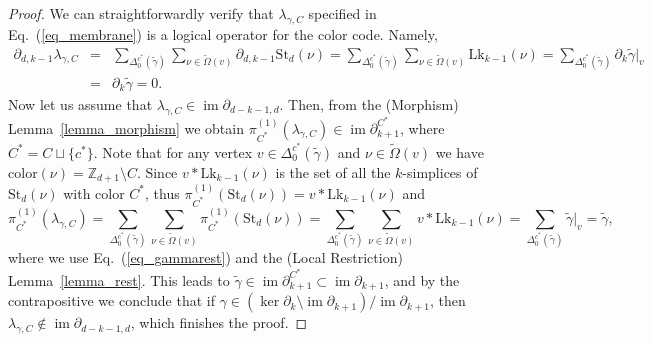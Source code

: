 \documentclass[onecolumn,letterpaper,11pt,accepted=2022-12-19]{quantumarticle}
\newcommand{\facex}[3]{{\Delta^{#1}_{#2}(#3)}}
\newcommand{\link}[2]{{\mathrm{Lk}_{#1}(#2)}}
\renewcommand{\star}[2]{{\mathrm{St}_{#1}(#2)}}
\DeclareMathOperator{\im}{im}
\newcommand{\bnd}[2]{\partial_{#1,#2}}
\newcommand{\rest}[1]{|_{#1}}
\newcommand{\col}[1]{{\mathrm{color}(#1)}}
\theoremstyle{definition}
\theoremstyle{lemma}
\theoremstyle{theorem}
\theoremstyle{corollary}
\begin{document}
{\begin{proof}
We can straightforwardly verify that $\lambda_{\gamma,C}$ specified in Eq.~(\ref{eq_membrane}) is a logical operator for the color code.
Namely,
\begin{eqnarray}
\bnd d {k-1} \lambda_{\gamma,C}
&=& \sum_{\facex {c^*} 0 {\widetilde\gamma}} \sum_{\nu\in\widetilde\Omega(v)} \bnd d {k-1} \star d \nu
= \sum_{\facex {c^*} 0 {\widetilde\gamma}} \sum_{\nu\in\widetilde\Omega(v)} \link {k-1} \nu
= \sum_{\facex {c^*} 0 {\widetilde\gamma}} \partial_k \widetilde\gamma\rest v\\
&=& \partial_k \widetilde\gamma = 0. 
\end{eqnarray}
Now let us assume that $\lambda_{\gamma,C} \in\im\bnd {d-k-1} d$.
Then, from the (Morphism) Lemma~\ref{lemma_morphism} we obtain $\pi^{(1)}_{C^*}(\lambda_{\gamma,C}) \in\im\partial^{C^*}_{k+1}$, where $C^*= C \sqcup \{ c^* \}$.
Note that for any vertex $v\in\facex {c^*} 0 {\widetilde\gamma}$ and $\nu\in\widetilde\Omega(v)$ we have $\col\nu = \mathbb{Z}_{d+1}\setminus C$. 
Since $v* \link {k-1} \nu$ is the set of all the $k$-simplices of $\star d \nu$ with color $C^*$, thus
$\pi^{(1)}_{C^*}(\star d \nu) = v* \link {k-1} \nu$ and
\begin{equation}
\pi^{(1)}_{C^*}(\lambda_{\gamma,C})
= \sum_{\facex {c^*} 0 {\widetilde\gamma}}  \sum_{\nu\in\widetilde\Omega(v)} \pi^{(1)}_{C^*}(\star d \nu)
= \sum_{\facex {c^*} 0 {\widetilde\gamma}} \sum_{\nu\in\widetilde\Omega(v)}  v * \link {k-1} \nu
= \sum_{\facex {c^*} 0 {\widetilde\gamma}} \widetilde\gamma\rest v 
= \widetilde\gamma,
\end{equation}
where we use Eq.~(\ref{eq_gammarest}) and the (Local Restriction) Lemma~\ref{lemma_rest}.
This leads to $\widetilde\gamma\in\im\partial_{k+1}^{C^*} \subset \im\partial_{k+1}$, and by the contrapositive we conclude that if $\gamma\in(\ker\partial_k\setminus\im\partial_{k+1}) / \im\partial_{k+1}$, then $\lambda_{\gamma,C} \not\in\im\bnd {d-k-1} d$, which finishes the proof.
\end{proof}



}
\end{document}
